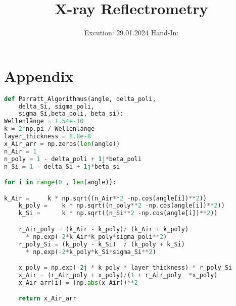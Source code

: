 

\subject{V44}
\title{X-ray Reflectrometry}
\date{%
  Excution: 29.01.2024
  \hspace{3em}
  Hand-In: 
}



\maketitle
\thispagestyle{empty}
\tableofcontents
\newpage
\setcounter{page}{1}







\printbibliography{}

\newpage

\section*{Appendix}
\begin{lstlisting}[language=python, caption=Parrat\_Algorithm]
def Parratt_Algorithmus(angle, delta_poli, 
    delta_Si, sigma_poli, 
    sigma_Si,beta_poli, beta_si):
Wellenlänge = 1.54e-10
k = 2*np.pi / Wellenlänge
layer_thickness = 8.8e-8
x_Air_arr = np.zeros(len(angle))
n_Air = 1
n_poly = 1 - delta_poli + 1j*beta_poli
n_Si = 1 - delta_Si + 1j*beta_si

for i in range(0 , len(angle)):

k_Air =     k * np.sqrt((n_Air**2 -np.cos(angle[i])**2))
    k_poly =    k * np.sqrt((n_poly**2 -np.cos(angle[i])**2))
    k_Si =      k * np.sqrt((n_Si**2 -np.cos(angle[i])**2))

    r_Air_poly = (k_Air - k_poly)/ (k_Air + k_poly)
      * np.exp(-2*k_Air*k_poly*sigma_poli**2)
    r_poly_Si = (k_poly - k_Si)  / (k_poly + k_Si) 
      * np.exp(-2*k_poly*k_Si*sigma_Si**2)

    x_poly = np.exp(-2j * k_poly * layer_thickness) * r_poly_Si
    x_Air = (r_Air_poly + x_poly)/(1 + r_Air_poly  *x_poly)
    x_Air_arr[i] = (np.abs(x_Air))**2

    return x_Air_arr
\end{lstlisting}


